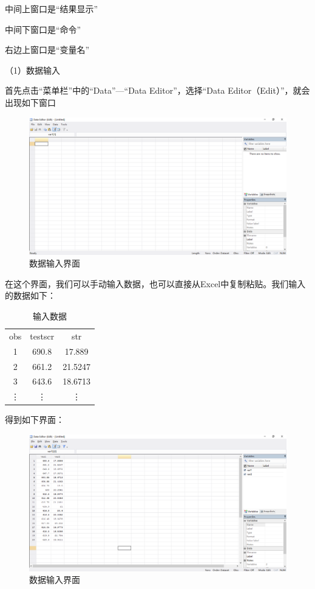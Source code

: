 \documentclass[cn,10pt,math=newtx,citestyle=gb7714-2015,bibstyle=gb7714-2015]{elegantbook}
\begin{document}
	中间上窗口是“结果显示”
	
	中间下窗口是“命令”
	
	右边上窗口是“变量名”
	
	（1）数据输入
	
	首先点击“菜单栏”中的“Data”—“Data Editor”，选择“Data Editor（Edit）”，就会出现如下窗口
	\begin{figure}[htbp]
		\centering
		\includegraphics[width=1\textwidth]{data edit.png}
		\caption{数据输入界面}\label{fig:digit}
	\end{figure}
	
	在这个界面，我们可以手动输入数据，也可以直接从Excel中复制粘贴。我们输入的数据如下：
	\begin{table}[htbp]
		\caption{输入数据}\label{tab:digit}
		\centering
		\begin{tabular}{ccc}
			\hline
			obs&testscr&str\\
			1&690.8&17.889\\
			2&661.2&21.5247\\
			3&643.6&18.6713\\
			\vdots&\vdots&\vdots\\
			\hline
		\end{tabular}
	\end{table}
	
	得到如下界面：
	\begin{figure}[htbp]
		\centering
		\includegraphics[width=1\textwidth]{data edit1.png}
		\caption{数据输入界面}\label{fig:digit}
	\end{figure}
	
\end{document}
